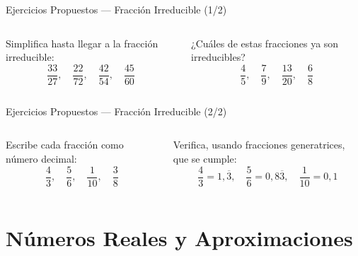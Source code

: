 \documentclass[aspectratio=169]{beamer}
\begin{document}
\begin{frame}{Ejercicios Propuestos — Fracción Irreducible \textnormal{(1/2)}}
  \begin{columns}[T]
    \begin{mwejercicio}
      Simplifica hasta llegar a la fracción irreducible:
      \[
        \frac{33}{27}, \quad \frac{22}{72}, \quad
        \frac{42}{54}, \quad \frac{45}{60}
      \]
    \end{mwejercicio}
    \begin{mwejercicio}
      ¿Cuáles de estas fracciones ya son irreducibles?
      \[
        \frac{4}{5}, \quad \frac{7}{9}, \quad
        \frac{13}{20}, \quad \frac{6}{8}
      \]
    \end{mwejercicio}
  \end{columns}
\end{frame}

\begin{frame}{Ejercicios Propuestos — Fracción Irreducible \textnormal{(2/2)}}
  \begin{columns}[T]
    \begin{mwejercicio}
      Escribe cada fracción como número decimal:
      \[
        \frac{4}{3}, \quad \frac{5}{6}, \quad
        \frac{1}{10}, \quad \frac{3}{8}
      \]
    \end{mwejercicio}
    \begin{mwejercicio}
      Verifica, usando fracciones generatrices, que se cumple:
      \[
        \frac{4}{3} = 1{,}\overline{3},
        \quad
        \frac{5}{6} = 0{,}8\overline{3},
        \quad
        \frac{1}{10} = 0{,}1
      \]
    \end{mwejercicio}
  \end{columns}
\end{frame}

\section{Números Reales y Aproximaciones}
\end{document}
